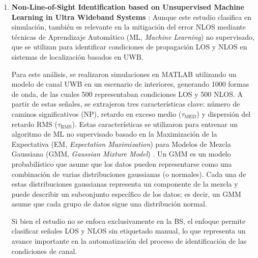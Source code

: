 \begin{enumerate}
    Los autores concluyen que, para la condición LOS, i.e., RHA $\approx$ 0, el error es mínimo, con una media de 5.5~cm y una desviación estándar de 3.6~cm. En la zona de transición con QLOS y RHA de $\approx 92\degree$, la difracción de la señal por el costado del cuerpo eleva el error a una media de 11.8~cm con una desviación estándar de 4.5~cm. En condición NLOS, i.e., RHA = $180\degree$, la obstrucción total del torso provoca que el error alcance su punto máximo, con una media de 38.9~cm y una desviación estándar de 13.9~cm.

    \item \textbf{Non-Line-of-Sight Identification based on Unsupervised Machine Learning in Ultra Wideband Systems} \cite{Fan2019}: Aunque este estudio clasifica en simulación, también es relevante en la mitigación del error NLOS mediante técnicas de Aprendizaje Automático (ML, \textit{Machine Learning}) no supervisado, que se utilizan para identificar condiciones de propagación LOS y NLOS en sistemas de localización basados en UWB. 
    
    Para este análisis, se realizaron simulaciones en MATLAB utilizando un modelo de canal UWB en un escenario de interiores, generando 1000 formas de onda, de las cuales 500 representaban condiciones LOS y 500 NLOS. A partir de estas señales, se extrajeron tres características clave: número de caminos significativos (NP), retardo en exceso medio ($\tau_{\textrm{MED}}$) y dispersión del retardo RMS ($\tau_{\textrm{RMS}}$). Estas características se utilizaron para entrenar un algoritmo de ML  no supervisado basado en la Maximización de la Expectativa (EM, \textit{Expectation Maximization}) para Modelos de Mezcla Gaussiana (GMM, \textit{Gaussian Mixture Model}) \cite{Fan2019}. Un GMM es un modelo probabilístico que asume que los datos pueden representarse como una combinación de varias distribuciones gaussianas (o normales). Cada una de estas distribuciones gaussianas representa un componente de la mezcla y puede describir un subconjunto específico de los datos; es decir, un GMM asume que cada grupo de datos sigue una distribución normal.
    
    Si bien el estudio no se enfoca exclusivamente en la BS, el enfoque permite clasificar señales LOS y NLOS sin etiquetado manual, lo que representa un avance importante en la automatización del proceso de identificación de las condiciones de canal. 
    

\end{enumerate}

